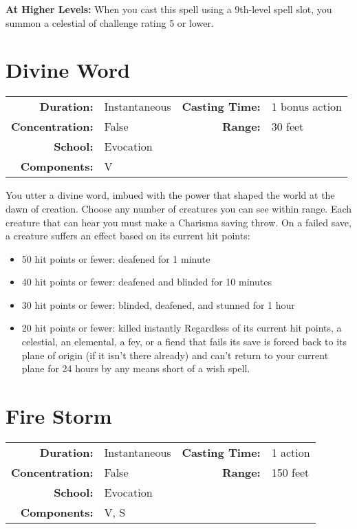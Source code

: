 \documentclass[a5paper, 12pt]{memoir}
\begin{document}
\vspace{8pt} \noindent\textbf{At Higher Levels:} When you cast this spell using a 9th-level spell slot, you summon a celestial of challenge rating 5 or lower.
\newpage
\section*{Divine Word}

{
\small\centering\vspace{-6pt}
\begin{tabular}{rlrl}
\toprule

\textbf{Duration:} & Instantaneous &
\textbf{Casting Time:} & 1 bonus action \\
\textbf{Concentration:} & False &
\textbf{Range:} & 30 feet \\
\textbf{School:} & Evocation \\
\textbf{Components:} & \multicolumn{3}{p{0.7\textwidth}}{V}\\

\bottomrule
\end{tabular}
}

\vspace{1\baselineskip}\noindent You utter a divine word, imbued with the power that shaped the world at the dawn of creation. Choose any number of creatures you can see within range. Each creature that can hear you must make a Charisma saving throw. On a failed save, a creature suffers an effect based on its current hit points:
\begin{itemize}
    \item 50 hit points or fewer: deafened for 1 minute
    \item 40 hit points or fewer: deafened and blinded for 10 minutes
    \item 30 hit points or fewer: blinded, deafened, and stunned for 1 hour
    \item 20 hit points or fewer: killed instantly Regardless of its current hit points, a celestial, an elemental, a fey, or a fiend that fails its save is forced back to its plane of origin (if it isn't there already) and can't return to your current plane for 24 hours by any means short of a wish spell.
\end{itemize}


\newpage
\section*{Fire Storm}

{
\small\centering\vspace{-6pt}
\begin{tabular}{rlrl}
\toprule

\textbf{Duration:} & Instantaneous &
\textbf{Casting Time:} & 1 action \\
\textbf{Concentration:} & False &
\textbf{Range:} & 150 feet \\
\textbf{School:} & Evocation \\
\textbf{Components:} & \multicolumn{3}{p{0.7\textwidth}}{V, S}\\

\bottomrule
\end{tabular}
}
\end{document}
